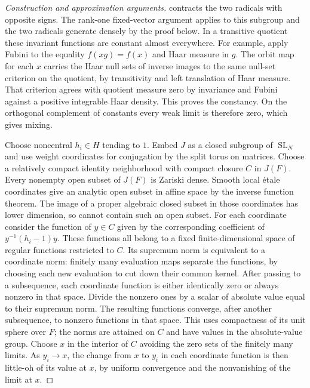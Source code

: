 \documentclass[11pt,a4paper,openany,oneside]{book}
\theoremstyle{resultstyle}
\theoremstyle{definition}
\numberwithin{equation}{chapter}
\begin{document}
\begin{proof}[Construction and approximation arguments]
contracts the two radicals with opposite signs.
The rank-one fixed-vector argument applies
to this subgroup and the two radicals
generate densely by the proof below.
In a transitive
quotient these invariant functions are constant almost
everywhere. For example, apply Fubini to the equality
\(f(xg)=f(x)\) and Haar measure in \(g\). The orbit map
for each \(x\) carries the Haar null sets of inverse
images to the same null-set criterion on the quotient,
by transitivity and left translation of Haar measure.
That criterion agrees with quotient measure zero by
invariance and Fubini against a positive integrable
Haar density. This proves the constancy. On the
orthogonal complement of constants every weak limit
is therefore zero, which gives mixing.

Choose noncentral \(h_i\in H\) tending to \(1\).
Embed \(J\) as a closed subgroup of \(\operatorname{SL}_N\)
and use weight coordinates for conjugation by the
split torus on matrices. Choose a relatively compact
identity neighborhood with compact closure \(C\) in
\(J(F)\). Every nonempty open subset of \(J(F)\) is
Zariski dense. Smooth local \'{e}tale coordinates give
an analytic open subset in affine space by the inverse
function theorem. The image of a proper algebraic
closed subset in those coordinates has lower dimension,
so cannot contain such an open subset. For each coordinate consider the
function of \(y\in C\) given by the corresponding
coefficient of \(y^{-1}(h_i-1)y\). These functions all
belong to a fixed finite-dimensional space of regular
functions restricted to \(C\). Its supremum norm is
equivalent to a coordinate norm: finitely many evaluation
maps separate the functions, by choosing each new
evaluation to cut down their common kernel. After
passing to a subsequence, each coordinate function is
either identically zero or always nonzero in that space.
Divide the nonzero ones by a scalar of absolute value
equal to their supremum norm. The resulting functions
converge, after another subsequence, to nonzero functions
in that space. This uses compactness of its unit sphere
over \(F\); the norms are attained on \(C\) and have
values in the absolute-value group. Choose \(x\) in the
interior of \(C\) avoiding the zero sets of the finitely
many limits. As \(y_i\to x\), the change from \(x\) to
\(y_i\) in each coordinate function is then little-oh
of its value at \(x\), by uniform convergence and the
nonvanishing of the limit at \(x\).


\end{proof}
\end{document}
